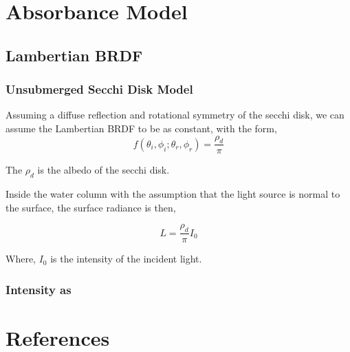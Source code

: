 \documentclass{article}
\begin{document}
\section{Absorbance Model}
\subsection{Lambertian BRDF}
\subsubsection{Unsubmerged Secchi Disk Model}

Assuming a diffuse reflection and rotational symmetry of the
secchi disk, we can assume the Lambertian BRDF to be
as constant, with the form,
\[
f(\theta_i, \phi_i; \theta_r , \phi_r) = \frac{\rho_d}{\pi}
\]

The $\rho_d$ is the albedo of the secchi disk.

Inside the water column with the assumption that the light source is normal to the surface,
the surface radiance is then,

\[
L = \frac{\rho_d}{\pi} I_0
\]

Where, $I_0$ is the intensity of the incident light.

\subsubsection{Intensity as }


\section{References}

\begin{thebibliography}{9}
\end{thebibliography}
\end{document}
